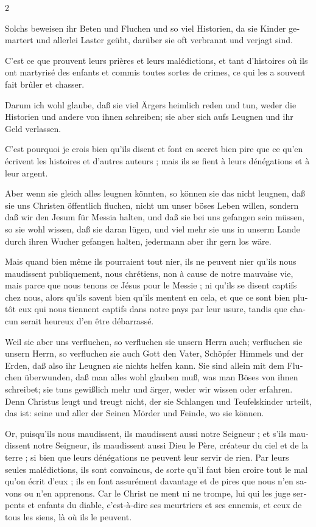 \documentclass[a4paper,12pt]{article}
\newcommand\chunks[2]{%
\begin{leftcolumn*}\begin{otherlanguage}{german}%
{#1}%
\end{otherlanguage}\end{leftcolumn*}%
\begin{rightcolumn}\begin{otherlanguage}{french}%
{#2}%
\end{otherlanguage}\end{rightcolumn}%
}
\begin{document}
\begin{paracol}{2}
  \chunks{Solchs beweisen ihr Beten und Fluchen und so viel Historien, da sie Kinder gemartert und allerlei Laster geübt, darüber sie oft verbrannt und verjagt sind.}
         {C’est ce que prouvent leurs prières et leurs malédictions, et tant d’histoires où ils ont martyrisé des enfants et commis toutes sortes de crimes, ce qui les a souvent fait brûler et chasser.}
  \chunks{Darum ich wohl glaube, daß sie viel Ärgers heimlich reden und tun, weder die Historien und andere von ihnen schreiben; sie aber sich aufs Leugnen und ihr Geld verlassen.}
         {C’est pourquoi je crois bien qu’ils disent et font en secret bien pire que ce qu’en écrivent les histoires et d’autres auteurs ; mais ils se fient à leurs dénégations et à leur argent.}
  \chunks{Aber wenn sie gleich alles leugnen könnten, so können sie das nicht leugnen, daß sie uns Christen öffentlich fluchen, nicht um unser böses Leben willen, sondern daß wir den Jesum für Messia halten, und daß sie bei uns gefangen sein müssen, so sie wohl wissen, daß sie daran lügen, und viel mehr sie uns in unserm Lande durch ihren Wucher gefangen halten, jedermann aber ihr gern los wäre.}
         {Mais quand bien même ils pourraient tout nier, ils ne peuvent nier qu’ils nous maudissent publiquement, nous chrétiens, non à cause de notre mauvaise vie, mais parce que nous tenons ce Jésus pour le Messie ; ni qu’ils se disent captifs chez nous, alors qu’ils savent bien qu’ils mentent en cela, et que ce sont bien plutôt eux qui nous tiennent captifs dans notre pays par leur usure, tandis que chacun serait heureux d’en être débarrassé.}
  \chunks{Weil sie aber uns verfluchen, so verfluchen sie unsern Herrn auch; verfluchen sie unsern Herrn, so verfluchen sie auch Gott den Vater, Schöpfer Himmels und der Erden, daß also ihr Leugnen sie nichts helfen kann. Sie sind allein mit dem Fluchen überwunden, daß man alles wohl glauben muß, was man Böses von ihnen schreibet; sie tuns gewißlich mehr und ärger, weder wir wissen oder erfahren. Denn Christus leugt und treugt nicht, der sie Schlangen und Teufelskinder urteilt, das ist: seine und aller der Seinen Mörder und Feinde, wo sie können.}
         {Or, puisqu’ils nous maudissent, ils maudissent aussi notre Seigneur ; et s’ils maudissent notre Seigneur, ils maudissent aussi Dieu le Père, créateur du ciel et de la terre ; si bien que leurs dénégations ne peuvent leur servir de rien. Par leurs seules malédictions, ils sont convaincus, de sorte qu’il faut bien croire tout le mal qu’on écrit d’eux ; ils en font assurément davantage et de pires que nous n’en savons ou n’en apprenons. Car le Christ ne ment ni ne trompe, lui qui les juge serpents et enfants du diable, c’est-à-dire ses meurtriers et ses ennemis, et ceux de tous les siens, là où ils le peuvent.}

\end{paracol}
\end{document}
